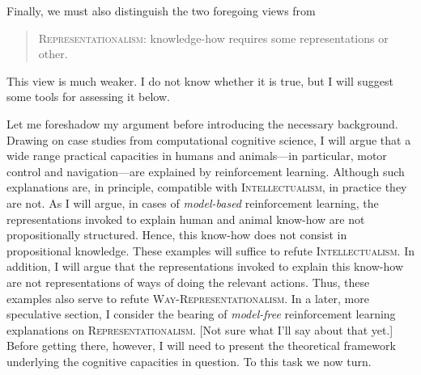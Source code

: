 Finally, we must also distinguish the two foregoing views from
\begin{quote}
	\textsc{Representationalism:} knowledge-how requires some representations or other.
\end{quote}
This view is much weaker.
I do not know whether it is true, but I will suggest some tools for assessing it below.

Let me foreshadow my argument before introducing the necessary background.
Drawing on case studies from computational cognitive science, I will argue that a wide range practical capacities in humans and animals---in particular, motor control and navigation---are explained by reinforcement learning.
Although such explanations are, in principle, compatible with \textsc{Intellectualism}, in practice they are not.
As I will argue, in cases of \emph{model-based} reinforcement learning, the representations invoked to explain human and animal know-how are not propositionally structured.
Hence, this know-how does not consist in propositional knowledge.
These examples will suffice to refute \textsc{Intellectualism}.
In addition, I will argue that the representations invoked to explain this know-how are not representations of ways of doing the relevant actions.
Thus, these examples also serve to refute \textsc{Way-Representationalism}.
In a later, more speculative section, I consider the bearing of \emph{model-free} reinforcement learning explanations on \textsc{Representationalism}.
[Not sure what I'll say about that yet.]
Before getting there, however, I will need to present the theoretical framework underlying the cognitive capacities in question.
To this task we now turn.
